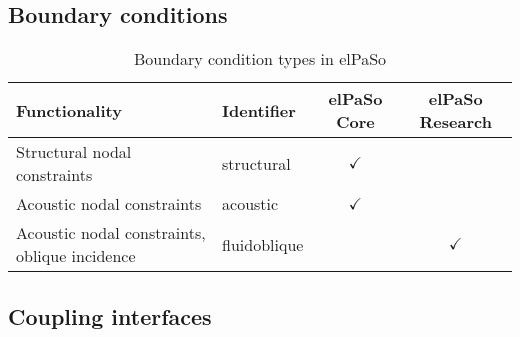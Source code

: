 \subsection{Boundary conditions}
\begin{table}[H]
    \centering
    \caption{Boundary condition types in elPaSo}
    \begin{tabular}{llcc}
        \hline
    Functionality                                 & Identifier   & \multicolumn{1}{c}{elPaSo Core} & \multicolumn{1}{c}{elPaSo Research} \\ \hline
    Structural nodal constraints                  & structural   & $\checkmark$                    &                                     \\
    Acoustic nodal constraints                    & acoustic     & $\checkmark$                    &                                     \\
    Acoustic nodal constraints, oblique incidence & fluidoblique &                                 & $\checkmark$                        \\ \hline
    \end{tabular}
    \end{table}

\subsection{Coupling interfaces}

